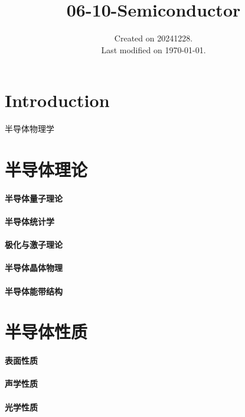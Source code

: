 \documentclass[UTF8]{../06-Physics}
\begin{document}
\title{06-10-Semiconductor}
\date{Created on 20241228.\\   Last modified on \today.}
\maketitle
\tableofcontents





\chapter{Introduction}
半导体物理学




\chapter{半导体理论}
    \subsubsection{半导体量子理论}
    \subsubsection{半导体统计学}
    \subsubsection{极化与激子理论}
    \subsubsection{半导体晶体物理}
    \subsubsection{半导体能带结构}
\chapter{半导体性质}
    \subsubsection{表面性质}
    \subsubsection{声学性质}
    \subsubsection{光学性质}
\end{document}

